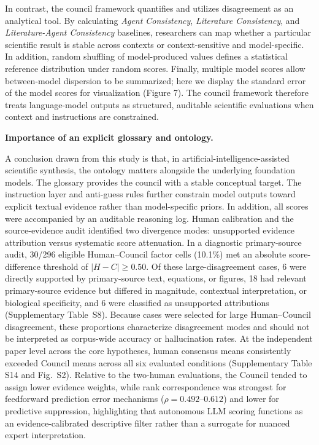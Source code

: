 \documentclass[12pt]{article}
\begin{document}
In contrast, the council framework quantifies and utilizes disagreement as an analytical tool. By calculating \emph{Agent Consistency}, \emph{Literature Consistency}, and \emph{Literature-Agent Consistency} baselines, researchers can map whether a particular scientific result is stable across contexts or context-sensitive and model-specific. In addition, random shuffling of model-produced values defines a statistical reference distribution under random scores. Finally, multiple model scores allow between-model dispersion to be summarized; here we display the standard error of the model scores for visualization (Figure 7). The council framework therefore treats language-model outputs as structured, auditable scientific evaluations when context and instructions are constrained.

\noindent\textbf{Importance of an explicit glossary and ontology.}

A conclusion drawn from this study is that, in artificial-intelligence-assisted scientific synthesis, the ontology matters alongside the underlying foundation models. The glossary provides the council with a stable conceptual target. The instruction layer and anti-guess rules\cite{ref58} further constrain model outputs toward explicit textual evidence rather than model-specific priors. In addition, all scores were accompanied by an auditable reasoning log. Human calibration and the source-evidence audit identified two divergence modes: unsupported evidence attribution versus systematic score attenuation. In a diagnostic primary-source audit, 30/296 eligible Human--Council factor cells (10.1\%) met an absolute score-difference threshold of $|H-C| \ge 0.50$. Of these large-disagreement cases, 6 were directly supported by primary-source text, equations, or figures, 18 had relevant primary-source evidence but differed in magnitude, contextual interpretation, or biological specificity, and 6 were classified as unsupported attributions (Supplementary Table~S8). Because cases were selected for large Human--Council disagreement, these proportions characterize disagreement modes and should not be interpreted as corpus-wide accuracy or hallucination rates. At the independent paper level across the core hypotheses, human consensus means consistently exceeded Council means across all six evaluated conditions (Supplementary Table S14 and Fig.~S2). Relative to the two-human evaluations, the Council tended to assign lower evidence weights, while rank correspondence was strongest for feedforward prediction error mechanisms ($\rho = 0.492\text{--}0.612$) and lower for predictive suppression, highlighting that autonomous LLM scoring functions as an evidence-calibrated descriptive filter rather than a surrogate for nuanced expert interpretation.
\end{document}
